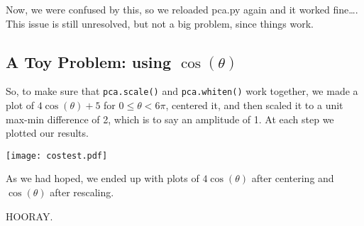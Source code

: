 \documentclass{article}
\begin{document}
Now, we were confused by this, so we reloaded pca.py again and it
worked fine\ldots.  This issue is still unresolved, but not a big
problem, since things work.

\subsection{A Toy Problem: using $\cos(\theta)$}
\label{sec:cos}

So, to make sure that \verb|pca.scale()| and \verb|pca.whiten()| work
together, we made a plot of $4\cos(\theta) + 5$ for $0 \leq \theta <
6\pi$, centered it, and then scaled it to a unit max-min difference of
2, which is to say an amplitude of 1.  At each step we plotted our
results.

\begin{center}
  \texttt{[image: costest.pdf]}  
\end{center}

As we had hoped, we ended up with plots of $4\cos(\theta)$ after
centering and $\cos(\theta)$ after rescaling.

\begin{center}
HOORAY.  
\end{center}
\end{document}
